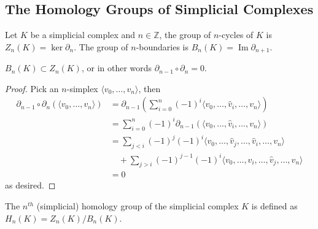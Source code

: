 \subsection{The Homology Groups of Simplicial Complexes}
\begin{definition}
    Let $K$ be a simplicial complex and $n\in\mathbb Z$, the group of $n$-cycles of $K$ is $Z_n(K)=\ker\partial_n$.
    The group of $n$-boundaries is $B_n(K)=\operatorname{Im}\partial_{n+1}$.
\end{definition}
\begin{lemma}
    $B_n(K)\subset Z_n(K)$, or in other words $\partial_{n-1}\circ\partial_n=0$.
\end{lemma}
\begin{proof}
    Pick an $n$-simplex $\langle v_0,\ldots,v_n\rangle$, then
    \begin{align*}
        \partial_{n-1}\circ\partial_n(\langle v_0,\ldots,v_n\rangle)&=\partial_{n-1}\left( \sum_{i=0}^n(-1)^i\langle v_0,\ldots,\hat{v}_i,\ldots,v_n\rangle \right)\\
        &=\sum_{i=0}^n(-1)^i\partial_{n-1}(\langle v_0,\ldots,\hat{v}_i,\ldots,v_n\rangle)\\
        &=\sum_{j<i}(-1)^j(-1)^i\langle v_0,\ldots,\hat{v}_j,\ldots,\hat{v}_i,\ldots,v_n\rangle\\
        &\quad+\sum_{j>i}(-1)^{j-1}(-1)^i\langle v_0,\ldots,\hat{v}_i,\ldots,\hat{v}_j,\ldots,v_n\rangle\\
        &=0
    \end{align*}
    as desired.
\end{proof}
\begin{definition}
    The $n^{th}$ (simplicial) homology group of the simplicial complex $K$ is defined as $H_n(K)=Z_n(K)/B_n(K)$.
\end{definition}
